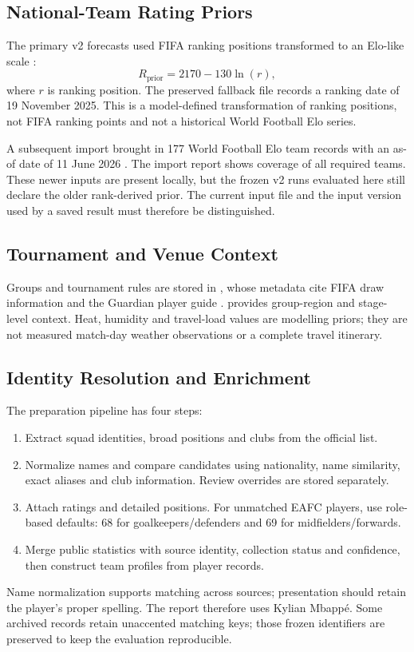 \documentclass[11pt,a4paper]{article}
\begin{document}
\subsection{National-Team Rating Priors}
The primary v2 forecasts used FIFA ranking positions transformed to an
Elo-like scale \cite{data-fifa-ranking}:
\begin{equation}
R_{\mathrm{prior}}=2170-130\ln(r),
\end{equation}
where $r$ is ranking position. The preserved fallback file records a ranking
date of 19 November 2025. This is a model-defined transformation of ranking
positions, not FIFA ranking points and not a historical World Football Elo series.

A subsequent import brought in 177 World Football Elo team records with an
as-of date of 11 June 2026 \cite{data-elo}. The import report shows coverage of all
required teams. These newer inputs are present locally, but the frozen v2 runs
evaluated here still declare the older rank-derived prior. The current input
file and the input version used by a saved result must therefore be distinguished.
\clearpage
\subsection{Tournament and Venue Context}
Groups and tournament rules are stored in
, whose metadata cite FIFA draw
information and the Guardian player guide \cite{data-draw,data-guardian}.
 provides group-region and stage-level
context. Heat, humidity and travel-load values are modelling priors; they are
not measured match-day weather observations or a complete travel itinerary.
\subsection{Identity Resolution and Enrichment}
The preparation pipeline has four steps:
\begin{enumerate}
\item Extract squad identities, broad positions and clubs from the official list.
\item Normalize names and compare candidates using nationality, name similarity,
exact aliases and club information. Review overrides are stored separately.
\item Attach ratings and detailed positions. For unmatched EAFC players, use
role-based defaults: 68 for goalkeepers/defenders and 69 for midfielders/forwards.
\item Merge public statistics with source identity, collection status and confidence,
then construct team profiles from player records.
\end{enumerate}
Name normalization supports matching across sources; presentation should retain
the player's proper spelling. The report therefore uses Kylian Mbapp\'{e}.
Some archived records retain unaccented matching keys; those frozen identifiers
are preserved to keep the evaluation reproducible.
\end{document}
